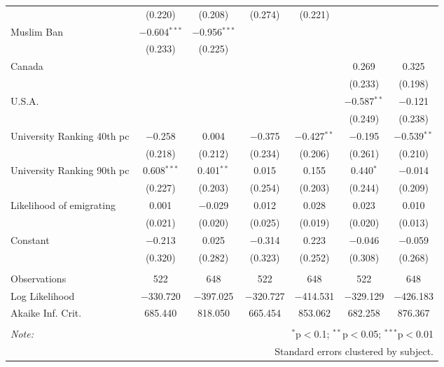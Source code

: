 \begin{sidewaystable}[!htbp]
\begin{tabular}{@{\extracolsep{5pt}}lcccccc}
  & (0.220) & (0.208) & (0.274) & (0.221) &  &  \\ 
  Muslim Ban & $-$0.604$^{***}$ & $-$0.956$^{***}$ &  &  &  &  \\ 
  & (0.233) & (0.225) &  &  &  &  \\ 
  Canada &  &  &  &  & 0.269 & 0.325 \\ 
  &  &  &  &  & (0.233) & (0.198) \\ 
  U.S.A. &  &  &  &  & $-$0.587$^{**}$ & $-$0.121 \\ 
  &  &  &  &  & (0.249) & (0.238) \\ 
  University Ranking 40th pc & $-$0.258 & 0.004 & $-$0.375 & $-$0.427$^{**}$ & $-$0.195 & $-$0.539$^{**}$ \\ 
  & (0.218) & (0.212) & (0.234) & (0.206) & (0.261) & (0.210) \\ 
  University Ranking 90th pc & 0.608$^{***}$ & 0.401$^{**}$ & 0.015 & 0.155 & 0.440$^{*}$ & $-$0.014 \\ 
  & (0.227) & (0.203) & (0.254) & (0.203) & (0.244) & (0.209) \\ 
  Likelihood of emigrating & 0.001 & $-$0.029 & 0.012 & 0.028 & 0.023 & 0.010 \\ 
  & (0.021) & (0.020) & (0.025) & (0.019) & (0.020) & (0.013) \\ 
  Constant & $-$0.213 & 0.025 & $-$0.314 & 0.223 & $-$0.046 & $-$0.059 \\ 
  & (0.320) & (0.282) & (0.323) & (0.252) & (0.308) & (0.268) \\ 
 \hline \\[-1.8ex] 
Observations & 522 & 648 & 522 & 648 & 522 & 648 \\ 
Log Likelihood & $-$330.720 & $-$397.025 & $-$320.727 & $-$414.531 & $-$329.129 & $-$426.183 \\ 
Akaike Inf. Crit. & 685.440 & 818.050 & 665.454 & 853.062 & 682.258 & 876.367 \\ 
\hline 
\hline \\[-1.8ex] 
\textit{Note:}  & \multicolumn{6}{r}{$^{*}$p$<$0.1; $^{**}$p$<$0.05; $^{***}$p$<$0.01} \\ 
 & \multicolumn{6}{r}{Standard errors clustered by subject.} \\ 
\end{tabular} 
\end{sidewaystable} 

